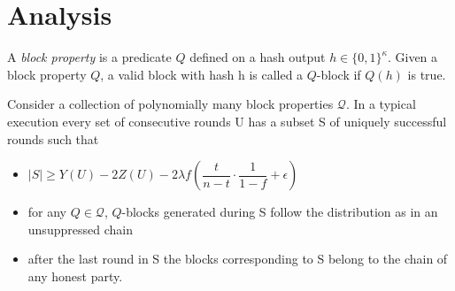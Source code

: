 \section{Analysis}
\begin{definition}
    \cite{dionyziz}
    A \emph{block property} is a predicate $Q$ defined on a hash output $h \in \{ 0, 1 \}^\kappa$. Given  a block property $Q$, a valid block with hash h is called a $Q$-block if $Q(h)$ is true.
\end{definition}

\begin{lemma}[Unsuppressibility]\cite{dionyziz}
    Consider a collection of polynomially many block properties $\mathcal{Q}$. In a typical execution every set of consecutive rounds U has a subset S of uniquely successful rounds such that
    \begin{itemize}
        \item $\lvert S \rvert \geq Y(U) - 2Z(U) - 2 \lambda f (\dfrac{t}{n-t} \cdot \dfrac{1}{1-f} + \epsilon)$
        \item for any $Q \in \mathcal{Q}$, $Q$-blocks generated during S follow the distribution as in an unsuppressed chain
        \item after the last round in S the blocks corresponding to S belong to the chain of any honest party.
    \end{itemize}
\end{lemma}

